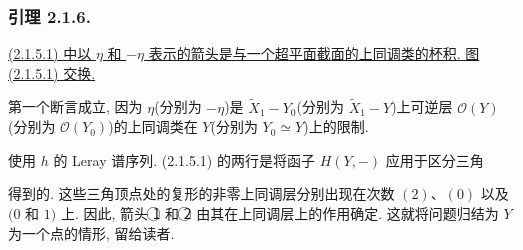 \subsubsection*{引理 2.1.6.}
\underline{(2.1.5.1) 中以 $\eta$ 和 $-\eta$ 表示的箭头是与一个超平面截面的上同调类的杯积. 图 (2.1.5.1) 交换.}

第一个断言成立, 因为 $\eta$(分别为 $-\eta$)是 $\widetilde X_1-Y_0$(分别为 $\widetilde X_1-Y$)上可逆层 $\mathcal O(Y)$(分别为 $\mathcal O(Y_0)$)的上同调类在 $Y$(分别为 $Y_0\simeq Y$)上的限制.

使用 $h$ 的 Leray 谱序列. (2.1.5.1) 的两行是将函子 $H(Y,-)$ 应用于区分三角
\begin{center}
\end{center}
得到的. 这些三角顶点处的复形的非零上同调层分别出现在次数 $(2)$、$(0)$ 以及 $(0$ 和 $1)$ 上. 因此, 箭头 \textcircled{\scriptsize 1} 和 \textcircled{\scriptsize 2} 由其在上同调层上的作用确定. 这就将问题归结为 $Y$ 为一个点的情形, 留给读者.